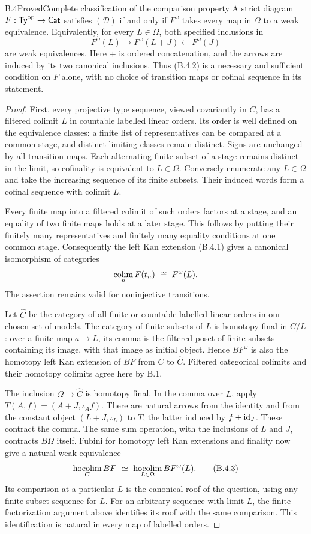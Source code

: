 \begin{claim}{B.4}{Proved}{Complete classification of the comparison property}
\label{B:classification}
A strict diagram $F:\mathsf{Ty}^{\mathrm{op}}\to\mathsf{Cat}$ satisfies $(\mathcal D)$
if and only if $F^\omega$ takes every map in $\Omega$ to a weak
equivalence. Equivalently, for every $L\in\Omega$, both specified
inclusions in
\[
 F^\omega(L)\longrightarrow F^\omega(L+J)
                 \longleftarrow F^\omega(J)
 \tag{B.4.2}
\]
are weak equivalences. Here $+$ is ordered concatenation, and
the arrows are induced by its two canonical inclusions.
Thus (B.4.2) is a necessary and sufficient condition on $F$ alone,
with no choice of transition maps or cofinal sequence in its statement.
\end{claim}
\begin{proof}
First, every projective type sequence, viewed covariantly in $C$,
has a filtered colimit $L$ in countable labelled linear orders.
Its order is well defined on the equivalence classes: a finite
list of representatives can be compared at a common stage, and
distinct limiting classes remain distinct. Signs are unchanged
by all transition maps. Each alternating finite subset of a stage
remains distinct in the limit, so cofinality is equivalent to
$L\in\Omega$. Conversely enumerate any $L\in\Omega$ and take
the increasing sequence of its finite subsets. Their induced
words form a cofinal sequence with colimit $L$.

Every finite map into a filtered colimit of such orders factors
at a stage, and an equality of two finite maps holds at a later
stage. This follows by putting their finitely many representatives
and finitely many equality conditions at one common stage.
Consequently the left Kan extension (B.4.1) gives a canonical
isomorphism of categories
\[
       \operatorname*{colim}_n F(t_n)\ \cong\ F^\omega(L).
\]
The assertion remains valid for noninjective transitions.

Let $\widehat C$ be the category of all finite or countable labelled
linear orders in our chosen set of models. The category of finite
subsets of $L$ is homotopy final in $C/L$: over a finite map
$a\to L$, its comma is the filtered poset of finite subsets
containing its image, with that image as initial object. Hence
$BF^\omega$ is also the homotopy left Kan extension of $BF$
from $C$ to $\widehat C$. Filtered categorical colimits and their
homotopy colimits agree here by B.1.

The inclusion $\Omega\to\widehat C$ is homotopy final. In the
comma over $L$, apply $T(A,f)=(A+J,\iota_A f)$. There are natural
arrows from the identity and from the constant object
$(L+J,\iota_L)$ to $T$, the latter induced by $f+\mathrm{id}_J$.
These contract the comma. The same sum operation, with the
inclusions of $L$ and $J$, contracts $B\Omega$ itself. Fubini
for homotopy left Kan extensions and finality now give a natural
weak equivalence
\[
 \hocolim_C BF\ \simeq\ \hocolim_{L\in\Omega}BF^\omega(L).
 \tag{B.4.3}
\]
Its comparison at a particular $L$ is the canonical roof of
the question, using any finite-subset sequence for $L$. For an
arbitrary sequence with limit $L$, the finite-factorization
argument above identifies its roof with the same comparison.
This identification is natural in every map of labelled orders.


\end{proof}
